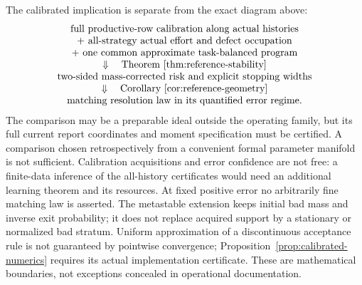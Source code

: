 The calibrated implication is separate from the exact diagram above:
\[
\begin{array}{c}
 \text{full productive-row calibration along actual histories}\\
 +\ \text{all-strategy actual effort and defect occupation}\\
 +\ \text{one common approximate task-balanced program}\\
 \Downarrow\quad\text{Theorem~\ref{thm:reference-stability}}\\
 \text{two-sided mass-corrected risk and explicit stopping widths}\\
 \Downarrow\quad\text{Corollary~\ref{cor:reference-geometry}}\\
 \text{matching resolution law in its quantified error regime}.
\end{array}
\]
The comparison may be a preparable ideal outside the operating family, but its full current report coordinates and moment specification must be certified. A comparison chosen retrospectively from a convenient formal parameter manifold is not sufficient. Calibration acquisitions and error confidence are not free: a finite-data inference of the all-history certificates would need an additional learning theorem and its resources. At fixed positive error no arbitrarily fine matching law is asserted. The metastable extension keeps initial bad mass and inverse exit probability; it does not replace acquired support by a stationary or normalized bad stratum. Uniform approximation of a discontinuous acceptance rule is not guaranteed by pointwise convergence; Proposition~\ref{prop:calibrated-numerics} requires its actual implementation certificate. These are mathematical boundaries, not exceptions concealed in operational documentation.
